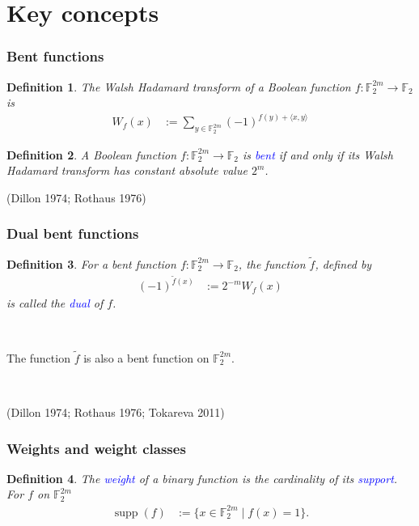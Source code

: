 \documentclass[pdf,sprung,slideColor,nocolorBG]{beamer}
\newenvironment{colortheme}[1]{
\def\ProvidesPackageRCS $##1${\relax}
\renewcommand{\ProcessOptions}{\relax}
\makeatletter

\makeatother
}{}
\newcommand{\slidecite}[1]{\tiny{(#1)}\normalsize{}}
\newcommand{\mb}[1]{\mathbb{#1}}
\newcommand{\Emph}[1]{\emph{\textcolor{blue}{#1}}}
\newcommand{\To}{\rightarrow}
\newcommand{\dual}[1]{\widetilde{#1}}
\newcommand{\support}[1]{\operatorname{supp}\left(#1\right)}
\newcommand{\F}{\mb{F}}
\newtheorem{Def}{Definition}
\begin{document}
\section{Key concepts}
\begin{colortheme}{seagull}
\begin{frame}
\frametitle{Bent functions}
\begin{Def}
\label{def-Walsh-Hadamard-transform}
The Walsh Hadamard transform of
a Boolean function $f : \F_2^{2m} \To \F_2$ is
\begin{align*}
W_f(x)
&:=
\sum_{y \in \F_2^{2m}} (-1)^{f(y) + \langle x, y \rangle}
\end{align*}
\end{Def}

\begin{Def}
\label{def-Bent-function}
A Boolean function $f : \F_2^{2m} \To \F_2$ is \Emph{bent}
if and only if its Walsh Hada\-mard transform has constant absolute value $2^{m}$.
\end{Def}
\slidecite{Dillon 1974; Rothaus 1976}
\end{frame}
\begin{frame}
\frametitle{Dual bent functions}

\begin{Def}
\label{def-dual-Bent-function}
For a bent function  $f : \F_2^{2m} \To \F_2$, the function $\dual{f}$, defined by
\begin{align*}
(-1)^{\dual{f}(x)} &:= 2^{-m} W_f(x)
\end{align*}
is called the \Emph{dual} of $f$.
\end{Def}

~

The function $\dual{f}$ is also a bent function on $\F_2^{2m}$.

~

\slidecite{Dillon 1974; Rothaus 1976; Tokareva 2011}
\end{frame}

\begin{colortheme}{jubata}
\begin{frame}
\frametitle{Weights and weight classes}
\begin{Def}
The \Emph{weight} of a binary function is the cardinality of its \Emph{support}.
For $f$ on $\F_2^{2m}$
\begin{align*}
\support{f} &:= \{x \in \F_2^{2m} \mid f(x)=1 \}.
\end{align*}


\end{Def}
\end{frame}
\end{colortheme}
\end{colortheme}
\end{document}
